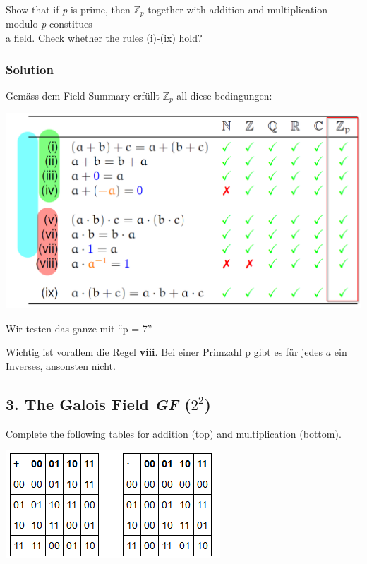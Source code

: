 \documentclass[11pt]{article}
\begin{document}
Show that if \emph{p} is prime, then \(\mathbb{Z}_{p}\) together with
addition and multiplication modulo \emph{p} constitues\\
a field. Check whether the rules (i)-(ix) hold?

\hypertarget{solution}{%
\subsubsection{Solution}\label{solution}}

Gemäss dem Field Summary erfüllt \(\mathbb{Z}_{p}\) all diese
bedingungen:

\includegraphics[scale=0.80]{img/fieldsum.png}

Wir testen das ganze mit ``p = 7''

Wichtig ist vorallem die Regel \textbf{viii}. Bei einer Primzahl p gibt
es für jedes \(a\) ein Inverses, ansonsten nicht.

    \hypertarget{the-galois-field-gf-22}{%
\subsection{\texorpdfstring{3. The Galois Field \emph{GF}
(\(2^{2}\))}{3: The Galois Field GF (2\^{}\{2\})}}\label{the-galois-field-gf-22}}

Complete the following tables for addition (top) and multiplication
(bottom).

\includegraphics{img/galois_22.png}
\end{document}
